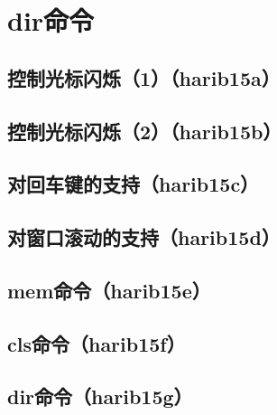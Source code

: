 ﻿\chapter{	dir命令	}
\section{	控制光标闪烁（1）（harib15a）	}
\section{	控制光标闪烁（2）（harib15b）	}
\section{	对回车键的支持（harib15c）	}
\section{	对窗口滚动的支持（harib15d）	}
\section{	mem命令（harib15e）	}
\section{	cls命令（harib15f）	}
\section{	dir命令（harib15g）	}

